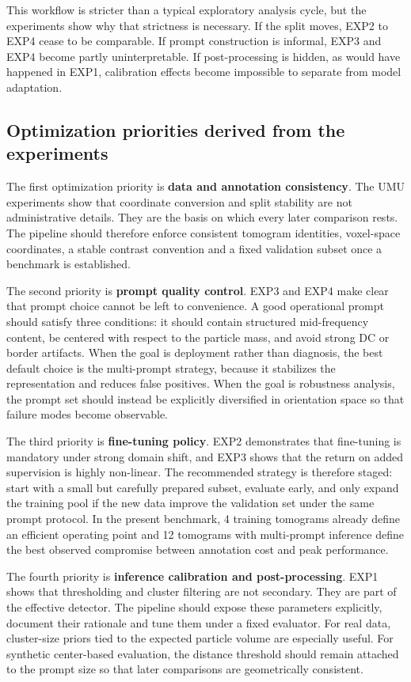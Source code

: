 \documentclass[12pt,a4paper]{report}
\begin{document}
This workflow is stricter than a typical exploratory analysis cycle, but the experiments show why that strictness is necessary. If the split moves, EXP2 to EXP4 cease to be comparable. If prompt construction is informal, EXP3 and EXP4 become partly uninterpretable. If post-processing is hidden, as would have happened in EXP1, calibration effects become impossible to separate from model adaptation.

\subsection{Optimization priorities derived from the experiments}
The first optimization priority is \textbf{data and annotation consistency}. The UMU experiments show that coordinate conversion and split stability are not administrative details. They are the basis on which every later comparison rests. The pipeline should therefore enforce consistent tomogram identities, voxel-space coordinates, a stable contrast convention and a fixed validation subset once a benchmark is established.

The second priority is \textbf{prompt quality control}. EXP3 and EXP4 make clear that prompt choice cannot be left to convenience. A good operational prompt should satisfy three conditions: it should contain structured mid-frequency content, be centered with respect to the particle mass, and avoid strong DC or border artifacts. When the goal is deployment rather than diagnosis, the best default choice is the multi-prompt strategy, because it stabilizes the representation and reduces false positives. When the goal is robustness analysis, the prompt set should instead be explicitly diversified in orientation space so that failure modes become observable.

The third priority is \textbf{fine-tuning policy}. EXP2 demonstrates that fine-tuning is mandatory under strong domain shift, and EXP3 shows that the return on added supervision is highly non-linear. The recommended strategy is therefore staged: start with a small but carefully prepared subset, evaluate early, and only expand the training pool if the new data improve the validation set under the same prompt protocol. In the present benchmark, 4 training tomograms already define an efficient operating point and 12 tomograms with multi-prompt inference define the best observed compromise between annotation cost and peak performance.

The fourth priority is \textbf{inference calibration and post-processing}. EXP1 shows that thresholding and cluster filtering are not secondary. They are part of the effective detector. The pipeline should expose these parameters explicitly, document their rationale and tune them under a fixed evaluator. For real data, cluster-size priors tied to the expected particle volume are especially useful. For synthetic center-based evaluation, the distance threshold should remain attached to the prompt size so that later comparisons are geometrically consistent.
\end{document}

